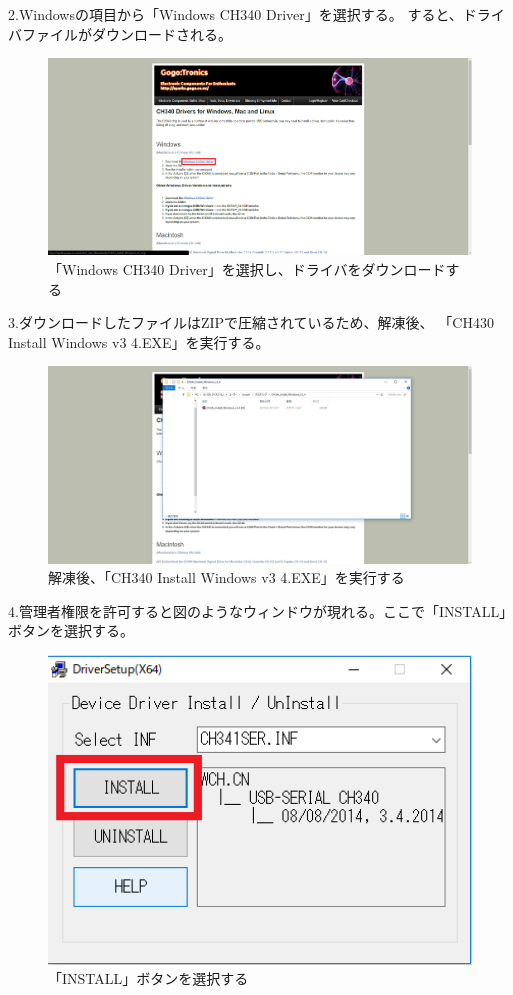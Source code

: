 \documentclass[uplatex]{jsarticle}
\begin{document}
2.Windowsの項目から「Windows CH340 Driver」を選択する。
すると、ドライバファイルがダウンロードされる。
\begin{figure}
    \centering
    \includegraphics[width=13cm]{driver_2.png}
    \caption{「Windows CH340 Driver」を選択し、ドライバをダウンロードする}
\end{figure}

3.ダウンロードしたファイルはZIPで圧縮されているため、解凍後、
「CH430 Install Windows v3 4.EXE」を実行する。
\begin{figure}
    \centering
    \includegraphics[width=13cm]{driver_3.png}
    \caption{解凍後、「CH340 Install Windows v3 4.EXE」を実行する}
\end{figure}

4.管理者権限を許可すると図のようなウィンドウが現れる。ここで「INSTALL」ボタンを選択する。
\begin{figure}
    \centering
    \includegraphics[width=13cm]{driver_4.png}
    \caption{「INSTALL」ボタンを選択する}
\end{figure}
\end{document}
